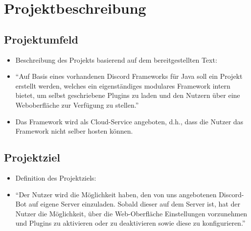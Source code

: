 
\section{Projektbeschreibung}\label{projektbeschreibung}

\subsection{Projektumfeld}\label{projektumfeld}

\begin{itemize}
  \item
        Beschreibung des Projekts basierend auf dem bereitgestellten Text:
  \item
        \enquote{Auf Basis eines vorhandenen Discord Frameworks für Java soll ein
        Projekt erstellt werden, welches ein eigenständiges modulares
        Framework intern bietet, um selbst geschriebene Plugins zu laden und
        den Nutzern über eine Weboberfläche zur Verfügung zu stellen.}
  \item
        Das Framework wird als Cloud-Service angeboten, d.h., dass die Nutzer
        das Framework nicht selber hosten können.
\end{itemize}

\subsection{Projektziel}\label{projektziel}

\begin{itemize}
  \item
        Definition des Projektziels:
  \item
        \enquote{Der Nutzer wird die Möglichkeit haben, den von uns angebotenen
        Discord-Bot auf eigene Server einzuladen. Sobald dieser auf dem Server
        ist, hat der Nutzer die Möglichkeit, über die Web-Oberfläche
        Einstellungen vorzunehmen und Plugins zu aktivieren oder zu
        deaktivieren sowie diese zu konfigurieren.}
\end{itemize}